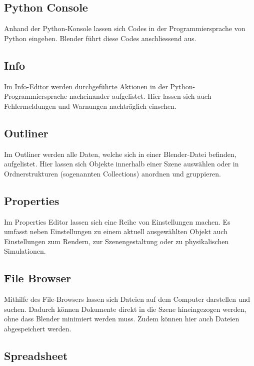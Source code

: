 \documentclass[
]{book}
\let\oldmarginnote\marginnote
\renewcommand{\marginnote}[1]{%
  \oldmarginnote{{\footnotesize\selectfont #1}}%
}
\begin{document}
\subsection{Python Console}\label{python-console}

Anhand der Python-Konsole lassen sich Codes in der Programmiersprache
von Python eingeben. Blender führt diese Codes anschliessend aus.

\subsection{Info}\label{info}

Im Info-Editor werden durchgeführte Aktionen in der
Python-Programmiersprache nacheinander aufgelistet. Hier lassen sich
auch Fehlermeldungen und Warnungen nachträglich einsehen.

\subsection{Outliner}\label{outliner}

\marginnote{«Data»-Editoren}

Im Outliner werden alle Daten, welche sich in einer Blender-Datei
befinden, aufgelistet. Hier lassen sich Objekte innerhalb einer Szene
auswählen oder in Ordnerstrukturen (sogenannten Collections) anordnen
und gruppieren.

\subsection{Properties}\label{properties}

Im Properties Editor lassen sich eine Reihe von Einstellungen machen. Es
umfasst neben Einstellungen zu einem aktuell ausgewählten Objekt auch
Einstellungen zum Rendern, zur Szenengestaltung oder zu physikalischen
Simulationen.

\subsection{File Browser}\label{file-browser}

Mithilfe des File-Browsers lassen sich Dateien auf dem Computer
darstellen und suchen. Dadurch können Dokumente direkt in die Szene
hineingezogen werden, ohne dass Blender minimiert werden muss. Zudem
können hier auch Dateien abgespeichert werden.

\subsection{Spreadsheet}\label{spreadsheet}
\end{document}
